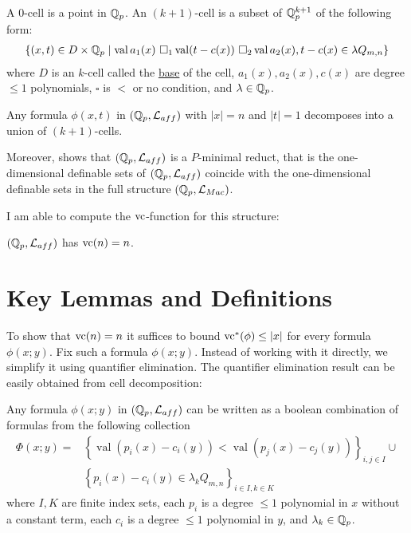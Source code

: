 \documentclass{amsart}
\renewcommand{\LL}{\mathcal L}
\newcommand{\LLM}{\mathcal L_{Mac}}
\newcommand{\curly}[1]{\left\{#1\right\}}
\DeclareMathOperator{\vval}{val}
\newcommand{\defn}{\underline}
\begin{document}
\begin{Definition} \label{cell}
  A $0$-cell is a point in $\mathbb{Q}_p$.
  An $(k+1)$-cell is a subset of $\mathbb{Q}_p^{k+1}$ of the following form:
  \begin{align*}
    \curly{(x, t) \in D \times \Q_p \mid \vval a_1(x) \ \square_1 \vval (t - c(x)) \ \square_2 \vval a_2(x), t - c(x) \in \lambda Q_{m,n} }
  \end{align*}
  where $D$ is an $k$-cell called the \defn{base} of the cell,
  $a_1(x), a_2(x), c(x)$ are degree $\leq 1$ polynomials,
  $\square$ is $<$ or no condition, and
  $\lambda  \in\mathbb{Q}_p$.
\end{Definition}

\begin{Theorem}[Leenknegt '12] 
  Any formula $\phi(x, t)$ in $(\Q_p, \LL_{aff})$ with $|x| = n$ and $|t| = 1$ decomposes into a union of $(k+1)$-cells.
\end{Theorem}  

Moreover, \cite{reduct} shows that $(\Q_p, \LL_{aff})$ is a $P$-minimal reduct,
that is the one-dimensional definable sets of $(\Q_p, \LL_{aff})$ coincide with the one-dimensional definable sets in the full structure $(\Q_p, \LLM)$.

I am able to compute the $\operatorname{vc}$-function for this structure:
\begin{Theorem} \label{main_theorem}
  $(\Q_p, \LL_{aff})$ has $\operatorname{vc}(n) = n$.
\end{Theorem}


\section{Key Lemmas and Definitions}




To show that $\operatorname{vc}(n) = n$ it suffices to bound $\operatorname{vc}^*(\phi) \leq |x|$ for every formula $\phi(x; y)$.
Fix such a formula $\phi(x; y)$.
Instead of working with it directly, we simplify it using quantifier elimination.
The quantifier elimination result can be easily obtained from cell decomposition:
\begin{Lemma} \label{quantifier_elimination}
  Any formula $\phi(x; y)$ in $(\Q_p, \LL_{aff})$ can be written as a boolean combination of formulas from the following collection
  \begin{align*}
    \Phi(x; y) = &\curly{\vval (p_i(x) - c_i(y)) < \vval (p_j(x) - c_j(y))}_{i, j \in I} \cup \\
                 &\curly{p_i(x) - c_i(y) \in \lambda_k Q_{m,n}}_{i \in I , k \in K}
  \end{align*}
  where $I, K$ are finite index sets,
  each $p_i$ is a degree $\leq 1$ polynomial in $x$ without a constant term,
  each $c_i$ is a degree $\leq 1$ polynomial in $y$, and
  $\lambda_k \in \mathbb{Q}_p$.
\end{Lemma}
\end{document}
